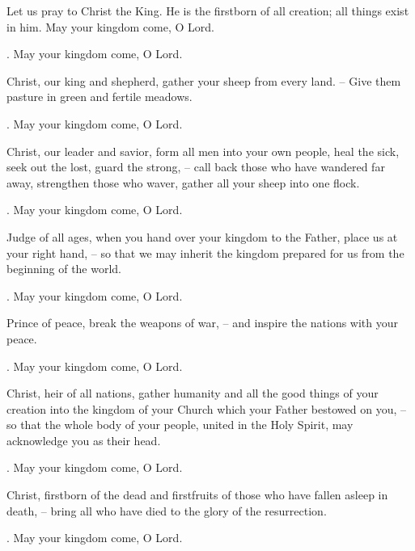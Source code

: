 \lettrine[loversize=0.15,lines=2]{L}{}et us pray to Christ the King. He is the firstborn of all creation; all things exist in him. May your kingdom come, O Lord.
\par \Rbar. May your kingdom come, O Lord.

Christ, our king and shepherd, gather your sheep from every land.
– Give them pasture in green and fertile meadows.
\par \Rbar. May your kingdom come, O Lord.

Christ, our leader and savior, form all men into your own people, heal the sick, seek out the lost, guard the strong,
– call back those who have wandered far away, strengthen those who waver, gather all your sheep into one flock.
\par \Rbar. May your kingdom come, O Lord.

Judge of all ages, when you hand over your kingdom to the Father, place us at your right hand,
– so that we may inherit the kingdom prepared for us from the beginning of the world.
\par \Rbar. May your kingdom come, O Lord.

Prince of peace, break the weapons of war,
– and inspire the nations with your peace.
\par \Rbar. May your kingdom come, O Lord.

Christ, heir of all nations, gather humanity and all the good things of your creation into the kingdom of your Church which your Father bestowed on you,
– so that the whole body of your people, united in the Holy Spirit, may acknowledge you as their head.
\par \Rbar. May your kingdom come, O Lord.

Christ, firstborn of the dead and firstfruits of those who have fallen asleep in death,
– bring all who have died to the glory of the resurrection.
\par \Rbar. May your kingdom come, O Lord.
